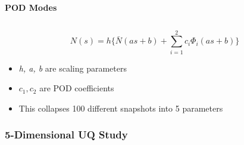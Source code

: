 \documentclass[9pt]{beamer}
\begin{document}
\begin{frame}
\begin{columns}[c]
    {\bf POD Modes}
\end{columns}
\vspace{1cm}
\begin{equation*}
N(s) = h \lbrace \bar{N}(as + b) + \sum_{i=1}^2 c_i \Phi_i(as + b)   \rbrace
\end{equation*}

\begin{itemize}
\item \emph{h, a, b} are scaling parameters
\item $c_1, c_2$ are POD coefficients
\item This collapses 100 different snapshots into 5 parameters
\end{itemize}
\end{frame}
\begin{frame}
\frametitle{5-Dimensional UQ Study}
\label{sec-3-3}



\end{frame}
\end{document}
